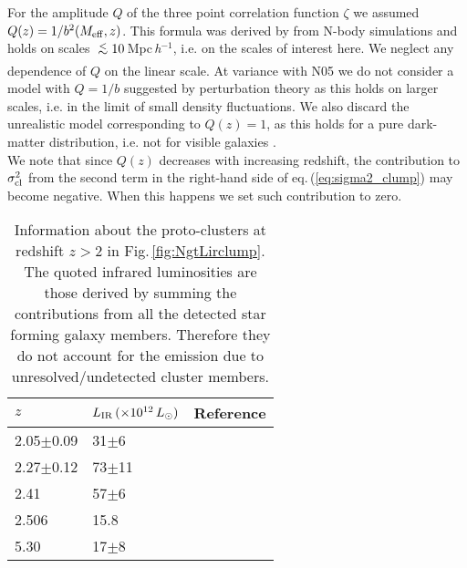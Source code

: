 \documentclass[useAMS,usenatbib]{mn2e}
\def\lsim{\,\lower2truept\hbox{${<\atop\hbox{\raise4truept\hbox{$\sim$}}}$}\,}
\begin{document}
For the amplitude $Q$ of the three point correlation function $\zeta$
we assumed $Q(z)=1/b^{2}(M_{\rm eff},z)$. This
formula was derived by \cite{Szapudi2001} from N-body simulations and
holds on scales $\lsim10\,$Mpc\,{\it h}$^{-1}$, i.e. on the scales of
interest here. We neglect any dependence of $Q$ on the
linear scale. At variance with N05 we do not consider a model with
$Q=1/b$ suggested by perturbation theory \citep{FG1993} as this holds
on larger scales, i.e. in the limit of small density
fluctuations. We also discard the unrealistic
model corresponding to $Q(z)=1$, as this holds for a pure dark-matter
distribution, i.e. not for visible galaxies
\citep[e.g.][]{Szapudi1996}. \\
%
We note that since $Q(z)$ decreases with increasing redshift, the
contribution to $\sigma^{2}_{\rm cl}$ from the second term in the
right-hand side
of eq.\,(\ref{eq:sigma2_clump}) may become negative. When this happens we set such contribution to zero.




\begin{table}
  \begin{center}
    \caption{Information about the proto-clusters at redshift $z>2$
      in Fig.\,\ref{fig:NgtLirclump}. The quoted infrared luminosities are those derived by summing
      the contributions from all the detected star forming galaxy
      members. Therefore they do not account for the emission due to
      unresolved/undetected cluster members.}\label{tab:info_protoclusters}
    \vspace{-0.0cm}
    \begin{tabular}{lll}
      \hline
      \hline
      $z$   & $L_{\rm IR}\,(\times10^{12}\,L_{\odot})$      &   Reference  \\
\hline
     2.05$\pm$0.09     &  31$\pm$6      &  \cite{Clements2014}  \\
      2.27$\pm$0.12    &  73$\pm$11    & \cite{Clements2014}  \\
     2.41                      &  57$\pm$6                  & \cite{Ivison2013}  \\
     2.506                    & 15.8             & \cite{Wang2016}  \\
     5.30                       &  17$\pm$8    & \cite{Capak2011}  \\
\hline
\hline
    \end{tabular}
  \end{center}
\end{table}
\end{document}
